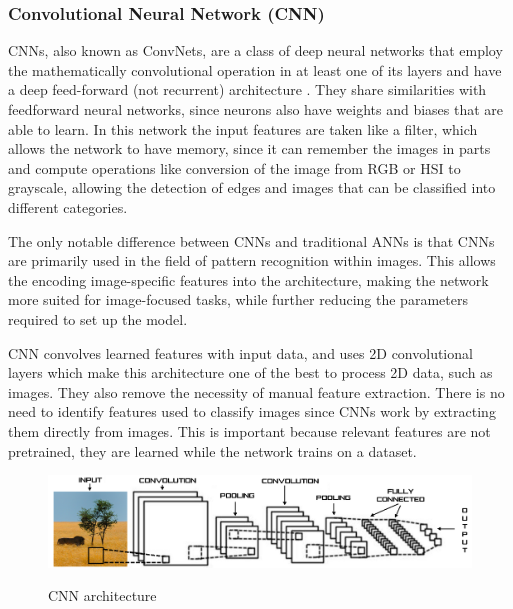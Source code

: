             \subsubsection{Convolutional Neural Network (CNN)}
            
            \par CNNs, also known as ConvNets, are a class of deep neural networks that employ the mathematically convolutional operation in at least one of its layers and have a deep feed-forward (not recurrent) architecture \cite{Ribeiro}. They share similarities with feedforward neural networks, since neurons also have weights and biases that are able to learn. In this network the input features are taken like a filter, which allows the network to have memory, since it can remember the images in parts and compute operations like conversion of the image from RGB or HSI to grayscale, allowing the detection of edges and images that can be classified into different categories. \cite{ArmaanMerchant2018} 

            \par The only notable difference between CNNs and traditional ANNs is that CNNs are primarily used in the field of pattern recognition within images. This allows the encoding image-specific features into the architecture, making the network more suited for image-focused tasks, while further reducing the parameters required to set up the model. \cite{OShea2015}
            
            

            \par CNN convolves learned features with input data, and uses 2D convolutional layers which make this architecture one of the best to process 2D data, such as images. They also remove the necessity of manual feature extraction. There is no need to identify features used to classify images since CNNs work by extracting them directly from images. This is important because relevant features are not pretrained, they are learned while the network trains on a dataset. \cite{mathworks_deeplearning}

            \begin{figure}[htb]
                \centering
                \includegraphics[scale = 0.17]{Sections/2StateOfTheArt/2_images/conv.png}
                \caption{CNN architecture }  \cite{Ribeiro}
            \end{figure}

